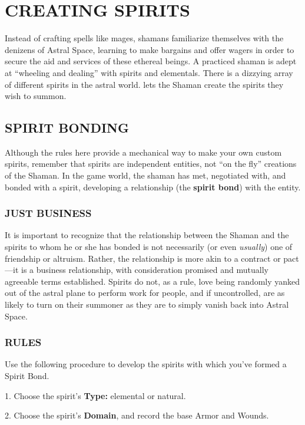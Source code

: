 \documentclass[oneside,10pt]{article}
\begin{document}
\section{CREATING SPIRITS}
\begin{multicols}{2}
Instead of crafting spells like mages, shamans familiarize
themselves with the denizens of Astral Space, learning to
make bargains and offer wagers in order to secure the aid
and services of these ethereal beings. A practiced shaman is
adept at “wheeling and dealing” with spirits and elementals.
There is a dizzying array of different spirits in the astral world.
\SW{} lets the Shaman create the spirits they wish to
summon.

\subsection{SPIRIT BONDING}
Although the rules here provide a mechanical way to make
your own custom spirits, remember that spirits are independent entities, not “on the fly” creations of the Shaman. In
the game world, the shaman has met, negotiated with, and
bonded with a spirit, developing a relationship (the \textbf{spirit
bond}) with the entity.

\subsubsection{JUST BUSINESS}
It is important to recognize that the relationship between the
Shaman and the spirits to whom he or she has bonded is
not necessarily (or even \textit{usually}) one of friendship or altruism.
Rather, the relationship is more akin to a contract or pact—it
is a business relationship, with consideration promised and
mutually agreeable terms established. Spirits do not, as a
rule, love being randomly yanked out of the astral plane to
perform work for people, and if uncontrolled, are as likely to
turn on their summoner as they are to simply vanish back into
Astral Space.

\subsubsection{RULES}
Use the following procedure to develop the spirits with which
you’ve formed a Spirit Bond.
\begin{adjustwidth*}{.5cm}{.5cm}

1.	Choose the spirit’s \textbf{Type:} elemental or natural.

2.	Choose the spirit’s \textbf{Domain}, and record the base Armor
and Wounds.


\end{adjustwidth*}
\end{multicols}
\end{document}
